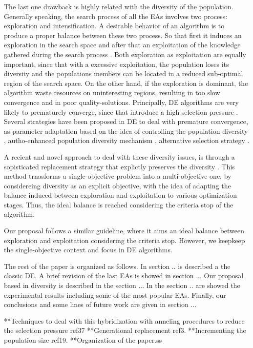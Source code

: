 %
The last one drawback is highly related with the diversity of the population.
%
Generally speaking, the search process of all the EAs involves two process: exploration and intensification.
%
A desirable behavior of an algorithm is to produce a proper balance between these two process.
%
So that first it induces an exploration in the search space and after that an exploitation of the knowledge gathered during the search process \cite{zaharie2003control}.
%
Both exploration as exploitation are equally important, since that with a excessive exploitation, the population loses its diversity and the populations members can be located in a reduced sub-optimal region of the search space.
%
On the other hand, if the exploration is dominant, the algorithm waste resources on uninteresting regions, resulting in too slow convergence and in poor quality-solutions.
%
Principally, DE algorithms are very likely to prematurely converge, since that introduce a high selection pressure \cite{sa2008exploration}.
%
Several strategies have been proposed in DE to deal with premature convergence, as parameter adaptation based on the idea of controlling the population diversity \cite{zaharie2003control}, autho-enhanced population diversity mechanism \cite{yang2015differential}, alternative selection strategy \cite{sa2008exploration}.


A recient and novel approach to deal with these diversity issues, is through a sopisticated replacement strategy that explictly preserves the diversity \cite{segura2016novel}.
%
This method trnasforms a single-objective problem into a multi-objective one, by considereing diversity as an explicit objective, with the idea of adapting the balance induced between exploration and exploitation to various optimization stages.
%
Thus, the ideal balance is reached considering the criteria stop of the algorithm.
%

Our proposal follows a similar guideline, where it aims an ideal balance between exploration and exploitation considering the criteria stop.
%
However, we keepkeep the single-objective context and focus in DE algorithms.



The rest of the paper is organized as follows.
%
In section .. is described a the classic DE.
%
A brief revision of the last EAs is showed in section ...
%
Our proposal based in diversity is described in the section ...
%
In the section .. are showed the experimental results including some of the most popular EAs.
%
Finally, our conclusions and some lines of future work are given in section ...

   **Techniques to deal with this hybridization with anneling procedures to reduce the selection pressure ref37
   **Generational replacement ref3.
   **Incrementing the population size ref19.
**Organization of the paper.ss
